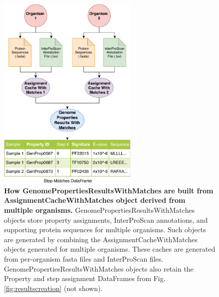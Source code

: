 \begin{figure}[!ht]
  \centering
\includegraphics[width=0.60\textwidth]{media/assignment_results_with_matches_overview.pdf}
	 \caption[How GenomePropertiesResultsWithMatches are built from 
AssignmentCacheWithMatches object derived from multiple organisms.]{\textbf{How 
GenomePropertiesResultsWithMatches are built from AssignmentCacheWithMatches 
object derived from multiple organisms.} GenomePropertiesResultsWithMatches 
objects store property assignments, InterProScan annotations, and supporting 
protein sequences for multiple organisms. Such objects are generated by combining the 
AssignmentCacheWithMatches objects generated for multiple organisms. These 
caches are generated from per-organism \gls{fasta} files and InterProScan files. 
GenomePropertiesResultsWithMatches objects also retain the Property and step 
assignment DataFrames from Fig. \ref{fig:resultscreation} (not shown).}
	 \label{fig:resultswithmatchescreation}
\end{figure} 

